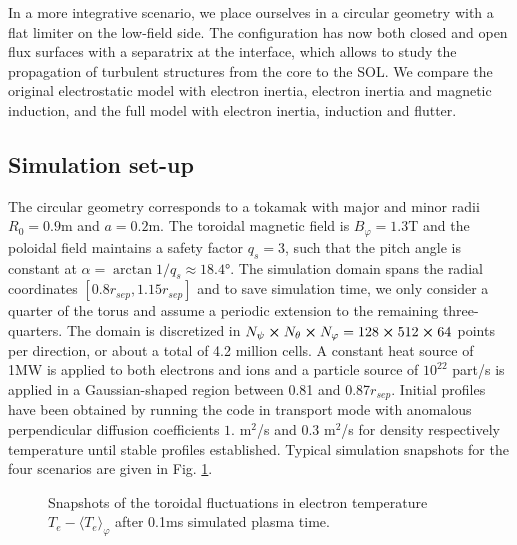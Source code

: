 In a more integrative scenario, we place ourselves in a circular geometry with a flat limiter on the low-field side. The configuration has now both closed and open flux surfaces with a separatrix at the interface, which allows to study the propagation of turbulent structures from the core to the SOL. We compare the original electrostatic model with electron inertia, electron inertia and magnetic induction, and the full model with electron inertia, induction and flutter.

\subsection{Simulation set-up}

The circular geometry corresponds to a tokamak with major and minor radii $R_0 = 0.9$m and $a=0.2$m. The toroidal magnetic field is $B_\varphi = 1.3$T and the poloidal field maintains a safety factor $q_s=3$, such that the pitch angle is constant at $\alpha = \arctan1/q_s \approx 18.4°$. The simulation domain spans the radial coordinates $[0.8r_{sep},1.15r_{sep}]$ and to save simulation time, we only consider a quarter of the torus and assume a periodic extension to the remaining three-quarters. The domain is discretized in $N_\psi\cross N_\theta \cross N_\varphi = 128\cross512\cross64$ points per direction, or about a total of 4.2 million cells. A constant heat source of 1MW is applied to both electrons and ions and a particle source of $10^{22}$ part/s is applied in a Gaussian-shaped region between 0.81 and 0.87$r_{sep}$. Initial profiles have been obtained by running the code in transport mode with anomalous perpendicular diffusion coefficients $1.$ m$^2$/s and $0.3$ m$^2$/s for density respectively temperature until stable profiles established. Typical simulation snapshots for the four scenarios are given in Fig. \ref{fig:anal_CIRC_fluctT}.

\begin{figure}[H]\centering
	\centering
	\caption{Snapshots of the toroidal fluctuations in electron temperature $T_e - \langle T_e\rangle_\varphi$ after 0.1ms simulated plasma time.}
	\label{fig:anal_CIRC_fluctT}
\end{figure}


